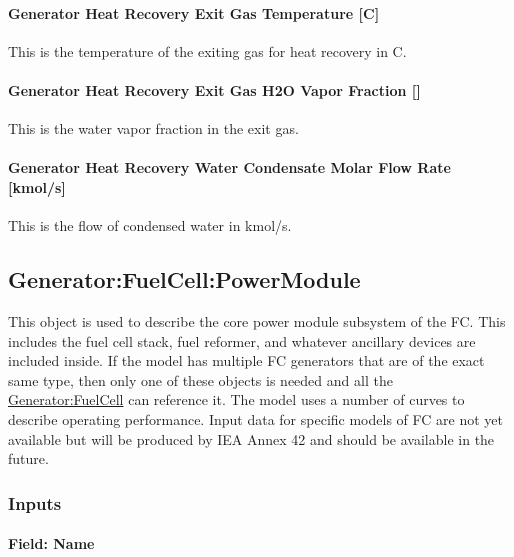 \paragraph{Generator Heat Recovery Exit Gas Temperature {[}C{]}}\label{generator-heat-recovery-exit-gas-temperature-c}

This is the temperature of the exiting gas for heat recovery in C.

\paragraph{Generator Heat Recovery Exit Gas H2O Vapor Fraction {[]}}\label{generator-heat-recovery-exit-gas-h2o-vapor-fraction}

This is the water vapor fraction in the exit gas.

\paragraph{Generator Heat Recovery Water Condensate Molar Flow Rate {[}kmol/s{]}}\label{generator-heat-recovery-water-condensate-molar-flow-rate-kmols}

This is the flow of condensed water in kmol/s.

\subsection{Generator:FuelCell:PowerModule}\label{generatorfuelcellpowermodule}

This object is used to describe the core power module subsystem of the FC. This includes the fuel cell stack, fuel reformer, and whatever ancillary devices are included inside. If the model has multiple FC generators that are of the exact same type, then only one of these objects is needed and all the \hyperref[generatorfuelcell]{Generator:FuelCell} can reference it. The model uses a number of curves to describe operating performance. Input data for specific models of FC are not yet available but will be produced by IEA Annex 42 and should be available in the future.

\subsubsection{Inputs}\label{inputs-13-003}

\paragraph{Field: Name}\label{field-name-14-001}

